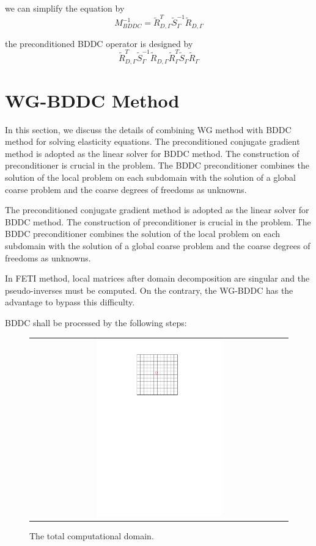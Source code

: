 we can simplify the equation by 
\begin{equation}
M_{BDDC}^{-1} = \tilde{R}_{D,\Gamma}^{T} \tilde{S}_{\Gamma}^{-1} \tilde{R}_{D, \Gamma}
\end{equation}

the preconditioned BDDC operator is designed by 
\begin{equation}
\tilde{R}_{D, \Gamma}^{T} \tilde{S}_{\Gamma}^{-1} \tilde{R}_{D, \Gamma} \tilde{R}_{\Gamma}^{T}\tilde{S}_{\Gamma}\tilde{R}_{\Gamma}
\end{equation}

\section{WG-BDDC Method}
In this section, we discuss the details of combining WG method with BDDC method for solving elasticity equations. 
The preconditioned conjugate gradient method is adopted as the linear solver for BDDC method. The construction of preconditioner is crucial in the problem. The BDDC preconditioner combines the solution of the local problem on each subdomain with the solution of a global coarse problem and the coarse degrees of freedoms as unknowns. 

The preconditioned conjugate gradient method is adopted as the linear solver for BDDC method. The construction of preconditioner is crucial in the problem. The BDDC preconditioner combines the solution of the local problem on each subdomain with the solution of a global coarse problem and the coarse degrees of freedoms as unknowns. 

In FETI method, local matrices after domain decomposition are singular and the pseudo-inverses must be computed. On the contrary, the WG-BDDC has the advantage to bypass this difficulty.

BDDC shall be processed by the following steps:

\begin{figure}[h]
	\centering
	\begin{tabular}{c}
		\includegraphics[width=0.5\textwidth]{./pics/domain.pdf}
	\end{tabular}
	\caption{\footnotesize The total computational domain.}\label{fig3: domain}
\end{figure}

